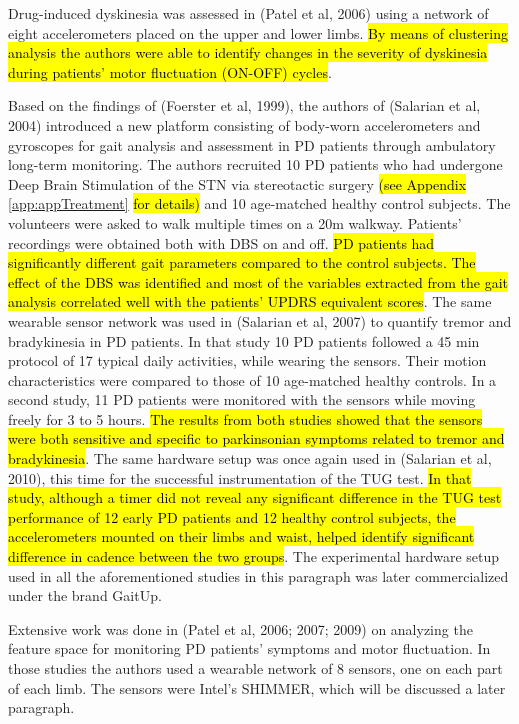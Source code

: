 Drug-induced dyskinesia was assessed in (Patel et al, 2006) using a network of eight accelerometers placed on the upper and lower limbs. \hl{By means of clustering analysis the authors were able to identify changes in the severity of dyskinesia during patients' motor fluctuation (ON-OFF) cycles}. 

Based on the findings of (Foerster et al, 1999), the authors of (Salarian et al, 2004) introduced a new platform consisting of body-worn accelerometers and gyroscopes for gait analysis and assessment in \gls{PD} patients through ambulatory long-term monitoring. The authors recruited 10 \gls{PD} patients who had undergone Deep Brain Stimulation of the \gls{STN} via stereotactic surgery \hl{(see Appendix }\ref{app:appTreatment}\hl{ for details)} and 10 age-matched healthy control subjects. The volunteers were asked to walk multiple times on a 20m walkway. Patients' recordings were obtained both with \gls{DBS} on and off. \hl{PD patients had significantly different gait parameters compared to the control subjects. The effect of the DBS was identified and most of the variables extracted from the gait analysis correlated well with the patients' UPDRS equivalent scores}. The same wearable sensor network was used in (Salarian et al, 2007) to quantify tremor and bradykinesia in \gls{PD} patients. In that study 10 \gls{PD} patients followed a 45 min protocol of 17 typical daily activities, while wearing the sensors. Their motion characteristics were compared to those of 10 age-matched healthy controls. In a second study, 11 \gls{PD} patients were monitored with the sensors while moving freely for 3 to 5 hours. \hl{The results from both studies showed that the sensors were both sensitive and specific to parkinsonian symptoms related to tremor and bradykinesia}. The same hardware setup was once again used in (Salarian et al, 2010), this time for the successful instrumentation of the \gls{TUG} test. \hl{In that study, although a timer did not reveal any significant difference in the TUG test performance of 12 early PD patients and 12 healthy control subjects, the accelerometers mounted on their limbs and waist, helped identify significant difference in cadence between the two groups}. The experimental hardware setup used in all the aforementioned studies in this paragraph was later commercialized under the brand GaitUp.

Extensive work was done in (Patel et al, 2006; 2007; 2009) on analyzing the feature space for monitoring \gls{PD} patients' symptoms and motor fluctuation. In those studies the authors used a wearable network of 8 sensors, one on each part of each limb. The sensors were Intel's \gls{SHIMMER}, which will be discussed a later paragraph. 

